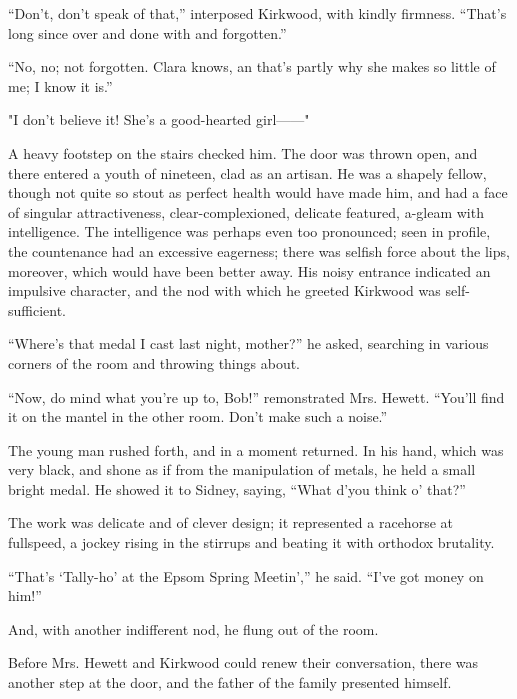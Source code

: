 ``Don't, don't speak of that,'' interposed Kirkwood, with kindly
firmness. ``That's long since over and done with and forgotten.''

{}``No, no; not forgotten. Clara knows, an that's partly why she makes
so little of me; I know it is.''

"I don't believe it! She's a good-hearted girl{{------}}"

A heavy footstep on the stairs checked him. The door was thrown open,
and there entered a youth of nineteen, clad as an artisan. He was a
shapely fellow, though not quite so stout as perfect health would have
made him, and had a face of singular attractiveness, clear-complexioned,
delicate featured, a-gleam with intelligence. The intelligence was
perhaps even too pronounced; seen in profile, the countenance had an
excessive eagerness; there was selfish force about the lips, moreover,
which would have been better away. His noisy entrance indicated an
impulsive character, and the nod with which he greeted Kirkwood was
self-sufficient.

``Where's that medal I cast last night, mother?'' he asked, searching in
various corners of the room and throwing things about.

{}``Now, do mind what you're up to, Bob!'' remonstrated Mrs. Hewett.
``You'll find it on the mantel in the other room. Don't make such a
noise.''

The young man rushed forth, and in a moment returned. In his hand, which
was very black, and shone as if from the manipulation of metals, he held
a small bright medal. He showed it to Sidney, saying, ``What d'you think
o' that?''

The work was delicate and of clever design; it represented a racehorse
at fullspeed, a jockey rising in the stirrups and beating it with
orthodox brutality.

``That's `Tally-ho' at the Epsom Spring Meetin','' he said. ``I've got
money on him!''

And, with another indifferent nod, he flung out of the room.

Before Mrs. Hewett and Kirkwood could renew their conversation, there
was another step at the door, and the father of the family presented
himself.
